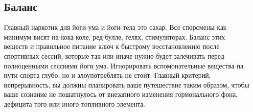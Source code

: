\subsection{Баланс}

Главный наркотик для йоги-ума и йоги-тела   это сахар. Все спорсмены как минимум висят на кока-коле, ред-булле, гелях, стимуляторах. Баланс этих веществ и правильное питание   ключ к быстрому восстановлению после спортивных сессий, которые так или иначе нужно будет залечивать перед полноценными сессиями йоги ума. Игнорировать вспомонательные вещества на пути спорта глубо, но и злоупотреблять не стоит. Главный критерий, непрерывность, вы должны планировать ваше путешествие таким образом, чтобы ваше сознание не пошатнулось от внезапного изменения гормонального фона, дефицита того или иного топливного элемента.


\normalsize
